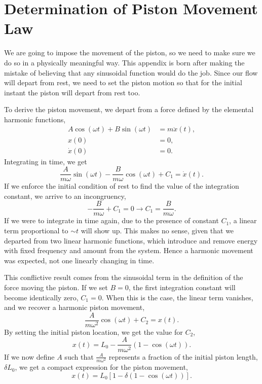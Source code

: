 \documentclass[../../thesis.tex]{subfiles}
\begin{document}
\section{Determination of Piston Movement Law}
\label{sec:appendix_piston_movement_law}
We are going to impose the movement of the piston, 
so we need to make sure we do so in a physically meaningful way.
This appendix is born after making the mistake of believing that any sinusoidal function would do the job.
Since our flow will depart from rest, 
we need to set the piston motion so that for the initial instant the piston will depart from rest too.

To derive the piston movement, we depart from a force defined by the elemental harmonic functions,
\begin{subequations}
\begin{align}
        A \cos(\omega t) + B \sin(\omega t) &= m \ddot{x}(t), 
        \\
        x(0) &= 0, 
        \\
        \dot{x}(0) &= 0.
\end{align}
\end{subequations}
Integrating in time, we get
\begin{equation}
    \frac{A}{m \omega} \sin(\omega t) - \frac{B}{m \omega} \cos(\omega t) + C_1 = \dot{x}(t).
\end{equation}
If we enforce the initial condition of rest to find the value of the integration constant, 
we arrive to an incongruency,
\begin{equation}
    - \frac{B}{m \omega} + C_1 = 0 \rightarrow C_1 = \frac{B}{m \omega}.
\end{equation}
If we were to integrate in time again, 
due to the presence of constant $C_1$, 
a linear term proportional to $\sim t$ will show up.
This makes no sense, given that we departed from two linear harmonic functions, 
which introduce and remove energy with fixed frequency and amount from the system. 
Hence a harmonic movement was expected, not one linearly changing in time.

This conflictive result comes from 
the sinusoidal term in the definition of the force moving the piston.
If we set $B=0$, the first integration constant will become identically zero, $C_1=0$. 
When this is the case, the linear term vanishes, and we recover a harmonic piston movement,
\begin{equation}
    \frac{A}{m \omega^2} \cos(\omega t) + C_2 = x(t).
\end{equation}
By setting the initial piston location, we get the value for $C_2$,
\begin{equation}
    x(t) = L_0 - \frac{A}{m \omega^2} \left(1 - \cos(\omega t)\right).
\end{equation}
If we now define $A$ such that $\frac{A}{m \omega^2}$ represents a fraction of the initial piston length, $\delta L_0$, 
we get a compact expression for the piston movement,
\begin{equation}
    x(t) = L_0\left[1 - \delta \left(1 - \cos(\omega t)\right)\right].
\end{equation}
\end{document}
